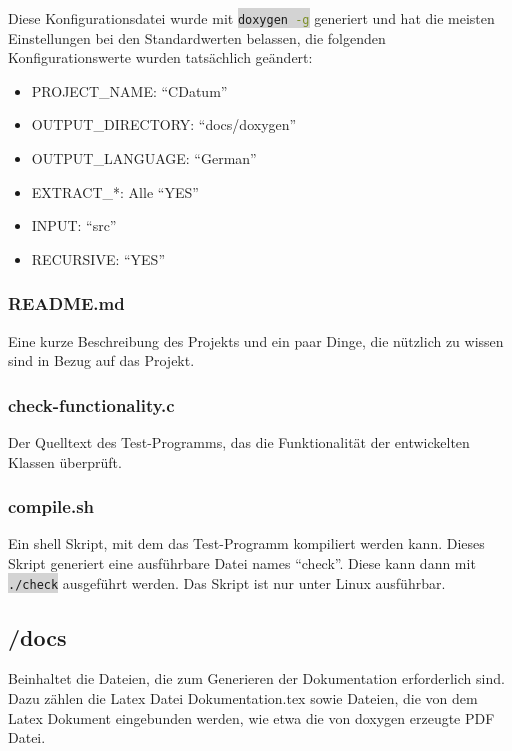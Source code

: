 \documentclass[12pt,pdftex,parskip=half]{scrartcl}
\newcommand{\inlinecode}[2]{\colorbox{lightgray}{\lstinline[language=#1]$#2$}}
\begin{document}
      Diese Konfigurationsdatei wurde mit \inlinecode{bash}{doxygen -g} generiert und hat die meisten Einstellungen bei den Standardwerten belassen, die folgenden Konfigurationswerte wurden tatsächlich geändert:

        \begin{itemize}
          \item PROJECT\_NAME: ``CDatum''
          \item OUTPUT\_DIRECTORY: ``docs/doxygen''
          \item OUTPUT\_LANGUAGE: ``German''
          \item EXTRACT\_*: Alle ``YES''
          \item INPUT: ``src''
          \item RECURSIVE: ``YES''
        \end{itemize}

      \subsubsection{README.md}
      Eine kurze Beschreibung des Projekts und ein paar Dinge, die nützlich zu wissen sind in Bezug auf das Projekt.

      \subsubsection{check-functionality.c}
      Der Quelltext des Test-Programms, das die Funktionalität der entwickelten Klassen überprüft.

      \subsubsection{compile.sh}
      Ein shell Skript, mit dem das Test-Programm kompiliert werden kann. Dieses Skript generiert eine ausführbare Datei names ``check''. Diese kann dann mit \inlinecode{bash}{./check} ausgeführt werden.
      Das Skript ist nur unter Linux ausführbar.

      \clearpage


    \subsection{/docs}

    Beinhaltet die Dateien, die zum Generieren der Dokumentation erforderlich sind.
    Dazu zählen die Latex Datei Dokumentation.tex sowie Dateien, die von dem Latex Dokument eingebunden werden, wie etwa die von doxygen erzeugte PDF Datei.
\end{document}
